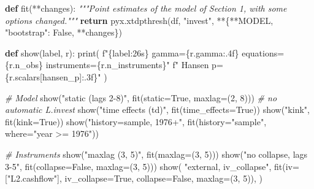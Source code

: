 \documentclass[
  10.5pt,
  a4paper,
]{article}
\newenvironment{Shaded}{}{}
\newcommand{\BuiltInTok}[1]{\textcolor[rgb]{0.00,0.50,0.00}{#1}}
\newcommand{\CommentTok}[1]{\textcolor[rgb]{0.38,0.63,0.69}{\textit{#1}}}
\newcommand{\ControlFlowTok}[1]{\textcolor[rgb]{0.00,0.44,0.13}{\textbf{#1}}}
\newcommand{\DecValTok}[1]{\textcolor[rgb]{0.25,0.63,0.44}{#1}}
\newcommand{\KeywordTok}[1]{\textcolor[rgb]{0.00,0.44,0.13}{\textbf{#1}}}
\newcommand{\NormalTok}[1]{#1}
\newcommand{\OperatorTok}[1]{\textcolor[rgb]{0.40,0.40,0.40}{#1}}
\newcommand{\SpecialCharTok}[1]{\textcolor[rgb]{0.25,0.44,0.63}{#1}}
\newcommand{\SpecialStringTok}[1]{\textcolor[rgb]{0.73,0.40,0.53}{#1}}
\newcommand{\StringTok}[1]{\textcolor[rgb]{0.25,0.44,0.63}{#1}}
\newcommand{\VariableTok}[1]{\textcolor[rgb]{0.10,0.09,0.49}{#1}}
\begin{document}
\begin{Shaded}
\begin{Highlighting}[]
\KeywordTok{def}\NormalTok{ fit(}\OperatorTok{**}\NormalTok{changes):}
    \CommentTok{"""Point estimates of the model of Section 1, with some options changed."""}
    \ControlFlowTok{return}\NormalTok{ pyx.xtdpthresh(df, }\StringTok{"invest"}\NormalTok{, }\OperatorTok{**}\NormalTok{\{}\OperatorTok{**}\NormalTok{MODEL, }\StringTok{"bootstrap"}\NormalTok{: }\VariableTok{False}\NormalTok{, }\OperatorTok{**}\NormalTok{changes\})}


\KeywordTok{def}\NormalTok{ show(label, r):}
    \BuiltInTok{print}\NormalTok{(}
        \SpecialStringTok{f"}\SpecialCharTok{\{}\NormalTok{label}\SpecialCharTok{:26s\}}\SpecialStringTok{ gamma=}\SpecialCharTok{\{}\NormalTok{r}\SpecialCharTok{.}\NormalTok{gamma}\SpecialCharTok{:.4f\}}\SpecialStringTok{  equations=}\SpecialCharTok{\{}\NormalTok{r}\SpecialCharTok{.}\NormalTok{n\_obs}\SpecialCharTok{\}}\SpecialStringTok{  instruments=}\SpecialCharTok{\{}\NormalTok{r}\SpecialCharTok{.}\NormalTok{n\_instruments}\SpecialCharTok{\}}\SpecialStringTok{"}
        \SpecialStringTok{f"  Hansen p=}\SpecialCharTok{\{}\NormalTok{r}\SpecialCharTok{.}\NormalTok{scalars[}\StringTok{\textquotesingle{}hansen\_p\textquotesingle{}}\NormalTok{]}\SpecialCharTok{:.3f\}}\SpecialStringTok{"}
\NormalTok{    )}


\CommentTok{\# Model}
\NormalTok{show(}\StringTok{"static (lags 2{-}8)"}\NormalTok{, fit(static}\OperatorTok{=}\VariableTok{True}\NormalTok{, maxlag}\OperatorTok{=}\NormalTok{(}\DecValTok{2}\NormalTok{, }\DecValTok{8}\NormalTok{)))  }\CommentTok{\# no automatic L.invest}
\NormalTok{show(}\StringTok{"time effects (td)"}\NormalTok{, fit(time\_effects}\OperatorTok{=}\VariableTok{True}\NormalTok{))}
\NormalTok{show(}\StringTok{"kink"}\NormalTok{, fit(kink}\OperatorTok{=}\VariableTok{True}\NormalTok{))}
\NormalTok{show(}\StringTok{"history=\textquotesingle{}sample\textquotesingle{}, 1976+"}\NormalTok{, fit(history}\OperatorTok{=}\StringTok{"sample"}\NormalTok{, where}\OperatorTok{=}\StringTok{"year \textgreater{}= 1976"}\NormalTok{))}

\CommentTok{\# Instruments}
\NormalTok{show(}\StringTok{"maxlag (3, 5)"}\NormalTok{, fit(maxlag}\OperatorTok{=}\NormalTok{(}\DecValTok{3}\NormalTok{, }\DecValTok{5}\NormalTok{)))}
\NormalTok{show(}\StringTok{"no collapse, lags 3{-}5"}\NormalTok{, fit(collapse}\OperatorTok{=}\VariableTok{False}\NormalTok{, maxlag}\OperatorTok{=}\NormalTok{(}\DecValTok{3}\NormalTok{, }\DecValTok{5}\NormalTok{)))}
\NormalTok{show(}
    \StringTok{"external, iv\_collapse"}\NormalTok{,}
\NormalTok{    fit(iv}\OperatorTok{=}\NormalTok{[}\StringTok{"L2.cashflow"}\NormalTok{], iv\_collapse}\OperatorTok{=}\VariableTok{True}\NormalTok{, collapse}\OperatorTok{=}\VariableTok{False}\NormalTok{, maxlag}\OperatorTok{=}\NormalTok{(}\DecValTok{3}\NormalTok{, }\DecValTok{5}\NormalTok{)),}
\NormalTok{)}


\end{Highlighting}
\end{Shaded}
\end{document}
